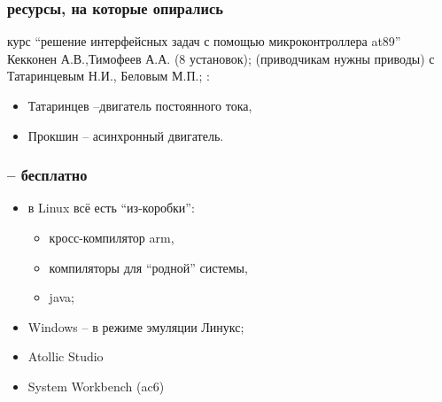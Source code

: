 \documentclass[14pt]{beamer}
\begin{document}
\begin{frame}
\frametitle{ ресурсы, на которые опирались}
\begin{itemize}
	 курс \enquote{решение интерфейсных задач с помощью микроконтроллера at89} Кекконен А.В.,Тимофеев А.А. (8 установок);%
 (приводчикам нужны приводы) с Татаринцевым Н.И., Беловым М.П.;
:
	\begin{itemize}
		\item Татаринцев --двигатель постоянного тока, 
		\item Прокшин -- асинхронный двигатель.
	\end{itemize}
\end{itemize}
\end{frame}


\begin{frame}
\frametitle{ -- бесплатно}
\begin{itemize}
	\item в Linux всё есть ``из-коробки'':
		\begin{itemize}
		\item кросс-компилятор arm,%
		\item компиляторы для ``родной'' системы,%
		\item  java;
		\end{itemize}
	\item Windows -- в режиме эмуляции Линукс;
	\item Atollic Studio 
	\item System Workbench (ac6) 
\end{itemize}
\end{frame}
\end{document}
